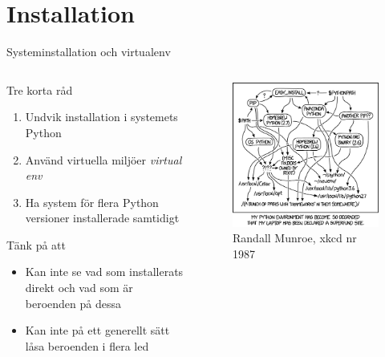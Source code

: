 \section{Installation}

\begin{frame}{Systeminstallation och virtualenv}
  \begin{columns}
    \begin{column}{0.7\linewidth}
      Tre korta råd
      \begin{enumerate}
        \item Undvik installation i systemets Python
        \item Använd virtuella miljöer \emph{virtual env}
        \item Ha system för flera Python versioner installerade samtidigt
      \end{enumerate}

      Tänk på att
      \begin{itemize}
        \item Kan inte se vad som installerats direkt och vad som är beroenden på dessa
        \item Kan inte på ett generellt sätt låsa beroenden i flera led
      \end{itemize}
    \end{column}
    \begin{column}{0.3\linewidth}
      \begin{figure}
        \includegraphics[width=\linewidth,keepaspectratio]{fig/python_environment}
        \caption{Randall Munroe, xkcd nr 1987}
      \end{figure}
    \end{column}
  \end{columns}
\end{frame}

